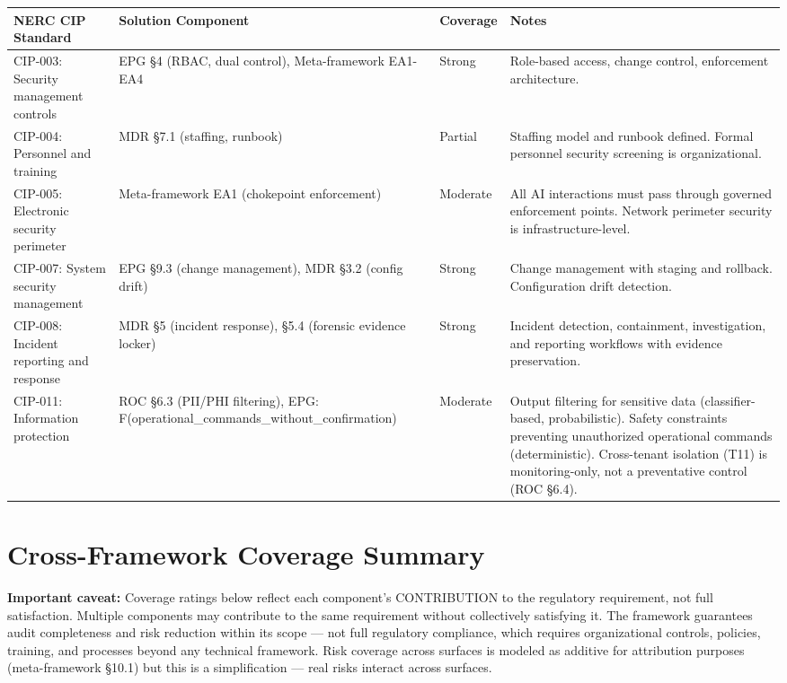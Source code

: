 \begin{table}[ht]
  \centering\small
  \begin{tabular}{@{}>{\raggedright\arraybackslash}p{1.44cm}>{\raggedright\arraybackslash}p{2.85cm}>{\raggedright\arraybackslash}p{1.08cm}>{\raggedright\arraybackslash}p{8.62cm}@{}}
  \toprule
  NERC CIP Standard & Solution Component & Coverage & Notes \\
  \midrule
  CIP-003: Security management controls & EPG \S{}4 (RBAC, dual control), Meta-framework EA1-EA4 & Strong & Role-based access, change control, enforcement architecture. \\
  CIP-004: Personnel and training & MDR \S{}7.1 (staffing, runbook) & Partial & Staffing model and runbook defined. Formal personnel security screening is organizational. \\
  CIP-005: Electronic security perimeter & Meta-framework EA1 (chokepoint enforcement) & Moderate & All AI interactions must pass through governed enforcement points. Network perimeter security is infrastructure-level. \\
  CIP-007: System security management & EPG \S{}9.3 (change management), MDR \S{}3.2 (config drift) & Strong & Change management with staging and rollback. Configuration drift detection. \\
  CIP-008: Incident reporting and response & MDR \S{}5 (incident response), \S{}5.4 (forensic evidence locker) & Strong & Incident detection, containment, investigation, and reporting workflows with evidence preservation. \\
  CIP-011: Information protection & ROC \S{}6.3 (PII/PHI filtering), EPG: F(operational\_\allowbreak{}commands\_\allowbreak{}without\_\allowbreak{}confirmation) & Moderate & Output filtering for sensitive data (classifier-based, probabilistic). Safety constraints preventing unauthorized operational commands (deterministic). Cross-tenant isolation (T11) is monitoring-only, not a preventative control (ROC \S{}6.4). \\
  \bottomrule
  \end{tabular}
\end{table}




\section{Cross-Framework Coverage Summary}
\label{sec:regmap-8}


\textbf{Important caveat:} Coverage ratings below reflect each component's CONTRIBUTION to the regulatory requirement, not full satisfaction. Multiple components may contribute to the same requirement without collectively satisfying it. The framework guarantees audit completeness and risk reduction within its scope --- not full regulatory compliance, which requires organizational controls, policies, training, and processes beyond any technical framework. Risk coverage across surfaces is modeled as additive for attribution purposes (meta-framework \S{}10.1) but this is a simplification --- real risks interact across surfaces.

